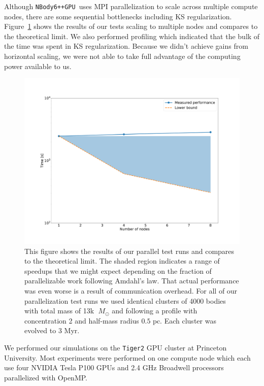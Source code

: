 \documentclass[preprint1]{aastex}
\newcommand\Msun{\; M_\odot}
\newcommand\pc{\mbox{ pc}}
\newcommand\nbody{\texttt{NBody6++GPU }}
\numberwithin{equation}{section}
\begin{document}
Although \nbody uses MPI parallelization to scale across multiple compute nodes, there are some sequential bottlenecks including KS regularization. Figure~\ref{fig:parallelperf} shows the results of our tests scaling to multiple nodes and compares to the theoretical limit.  We also performed profiling which indicated that the bulk of the time was spent in KS regularization. Because we didn't achieve gains from horizontal scaling, we were not able to take full advantage of the computing power available to us.
\begin{figure}
\centering
\includegraphics[width=\textwidth]{parallelperformance}
\caption{This figure shows the results of our parallel test runs and compares to the theoretical limit.  The shaded region indicates a range of speedups that we might expect depending on the fraction of parallelizable work following Amdahl's law.  That actual performance was even worse is a result of communication overhead. For all of our parallelization test runs we used identical clusters of 4000 bodies with total mass of 13k $\Msun$ and following a \citet{1966King} profile with concentration 2 and half-mass radius $0.5 \pc$.  Each cluster was evolved to 3 Myr.}
\label{fig:parallelperf}
\end{figure}

We performed our simulations on the \texttt{Tiger2} GPU cluster at Princeton University. Most experiments were performed on one compute node which each use four NVIDIA Tesla P100 GPUs and 2.4 GHz Broadwell processors parallelized with OpenMP.
\end{document}
